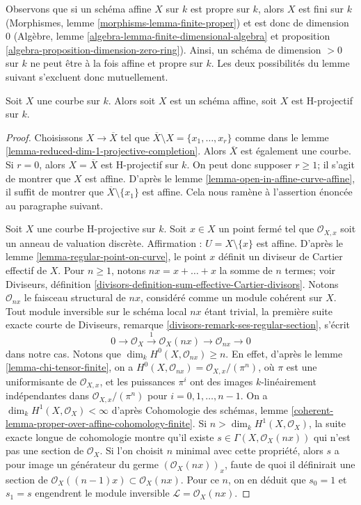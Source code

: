 \noindent
Observons que si un schéma affine $X$ sur $k$ est propre sur $k$,
alors $X$ est fini sur $k$ (Morphismes, lemme
\ref{morphisms-lemma-finite-proper}) et est donc de
dimension $0$
(Algèbre, lemme \ref{algebra-lemma-finite-dimensional-algebra} et
proposition \ref{algebra-proposition-dimension-zero-ring}).
Ainsi, un schéma de dimension $> 0$ sur $k$ ne peut être à la fois affine et
propre sur $k$. Les deux possibilités du lemme suivant
s'excluent donc mutuellement.

\begin{lemma}
\label{lemma-curve-affine-projective}
Soit $X$ une courbe sur $k$. Alors soit $X$ est un schéma affine, soit $X$
est H-projectif sur $k$.
\end{lemma}

\begin{proof}
Choisissons $X \to \overline{X}$ tel que
$\overline{X} \setminus X = \{x_1, \ldots, x_r\}$ comme dans le
lemme \ref{lemma-reduced-dim-1-projective-completion}.
Alors $\overline{X}$ est également une courbe.
Si $r = 0$, alors $X = \overline{X}$ est H-projectif sur $k$.
On peut donc supposer $r \geq 1$; il s'agit de montrer que
$X$ est affine. D'après le lemme \ref{lemma-open-in-affine-curve-affine},
il suffit de montrer que $\overline{X} \setminus \{x_1\}$ est affine.
Cela nous ramène à l'assertion énoncée au paragraphe suivant.

\medskip\noindent
Soit $X$ une courbe H-projective sur $k$. Soit $x \in X$ un point fermé
tel que $\mathcal{O}_{X, x}$ soit un anneau de valuation discrète. Affirmation :
$U = X \setminus \{x\}$ est affine. D'après le lemme \ref{lemma-regular-point-on-curve},
le point $x$ définit un diviseur de Cartier effectif de $X$.
Pour $n \geq 1$, notons $nx = x + \ldots + x$ la somme de $n$ termes; voir
Diviseurs, définition \ref{divisors-definition-sum-effective-Cartier-divisors}.
Notons $\mathcal{O}_{nx}$ le faisceau structural de $nx$, considéré comme un
module cohérent sur $X$.
Tout module inversible sur le schéma local $nx$ étant trivial,
la première suite exacte courte de
Diviseurs, remarque \ref{divisors-remark-ses-regular-section},
s'écrit
$$
0 \to \mathcal{O}_X
\xrightarrow{1} \mathcal{O}_X(nx) \to \mathcal{O}_{nx} \to 0
$$
dans notre cas. Notons que $\dim_k H^0(X, \mathcal{O}_{nx}) \geq n$.
En effet, d'après le lemme \ref{lemma-chi-tensor-finite}, on a
$H^0(X, \mathcal{O}_{nx}) = \mathcal{O}_{X, x}/(\pi^n)$, où $\pi$ est une uniformisante de
$\mathcal{O}_{X, x}$, et les puissances $\pi^i$ ont des images
$k$-linéairement indépendantes dans $\mathcal{O}_{X, x}/(\pi^n)$
pour $i = 0, 1, \ldots, n - 1$. On a $\dim_k H^1(X, \mathcal{O}_X) < \infty$
d'après Cohomologie des schémas, lemme
\ref{coherent-lemma-proper-over-affine-cohomology-finite}.
Si $n > \dim_k H^1(X, \mathcal{O}_X)$,
la suite exacte longue de cohomologie montre
qu'il existe $s \in \Gamma(X, \mathcal{O}_X(nx))$
qui n'est pas une section de $\mathcal{O}_X$.
Si l'on choisit $n$ minimal avec cette propriété, alors $s$
a pour image un générateur du germe
$\left(\mathcal{O}_X(nx)\right)_x$, faute de quoi il
définirait une section de $\mathcal{O}_X((n - 1)x) \subset \mathcal{O}_X(nx)$.
Pour ce $n$, on en déduit que $s_0 = 1$ et $s_1 = s$
engendrent le module inversible $\mathcal{L} = \mathcal{O}_X(nx)$.


\end{proof}

